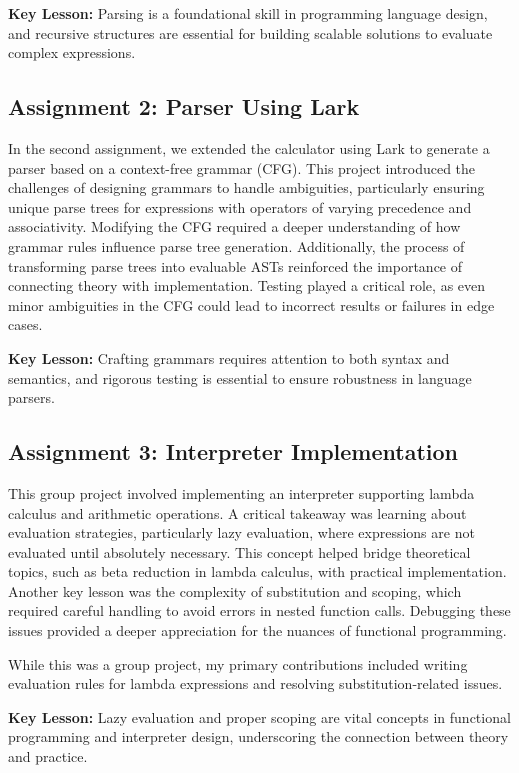 \documentclass{article}
\theoremstyle{theorem}
\theoremstyle{definition}
\theoremstyle{remark}
\begin{document}
\textbf{Key Lesson:} Parsing is a foundational skill in programming language design, and recursive structures are essential for building scalable solutions to evaluate complex expressions.

\subsection{Assignment 2: Parser Using Lark}
In the second assignment, we extended the calculator using Lark to generate a parser based on a context-free grammar (CFG). This project introduced the challenges of designing grammars to handle ambiguities, particularly ensuring unique parse trees for expressions with operators of varying precedence and associativity. Modifying the CFG required a deeper understanding of how grammar rules influence parse tree generation. Additionally, the process of transforming parse trees into evaluable ASTs reinforced the importance of connecting theory with implementation. Testing played a critical role, as even minor ambiguities in the CFG could lead to incorrect results or failures in edge cases.

\textbf{Key Lesson:} Crafting grammars requires attention to both syntax and semantics, and rigorous testing is essential to ensure robustness in language parsers.

\subsection{Assignment 3: Interpreter Implementation}
This group project involved implementing an interpreter supporting lambda calculus and arithmetic operations. A critical takeaway was learning about evaluation strategies, particularly lazy evaluation, where expressions are not evaluated until absolutely necessary. This concept helped bridge theoretical topics, such as beta reduction in lambda calculus, with practical implementation. Another key lesson was the complexity of substitution and scoping, which required careful handling to avoid errors in nested function calls. Debugging these issues provided a deeper appreciation for the nuances of functional programming.

While this was a group project, my primary contributions included writing evaluation rules for lambda expressions and resolving substitution-related issues.

\textbf{Key Lesson:} Lazy evaluation and proper scoping are vital concepts in functional programming and interpreter design, underscoring the connection between theory and practice.
\end{document}
